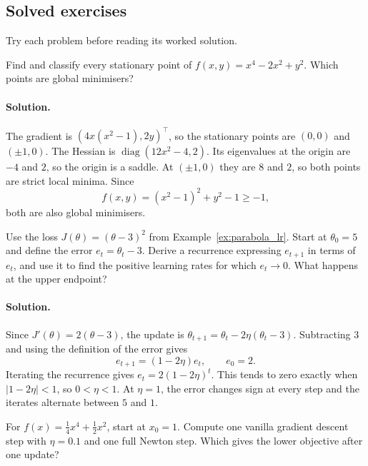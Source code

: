 \clearpage
\subsection{Solved exercises}

Try each problem before reading its worked solution.

\begin{exercise}
Find and classify every stationary point of $f(x,y)=x^4-2x^2+y^2$. Which points are global minimisers?
\end{exercise}

\paragraph{Solution.}
The gradient is $(4x(x^2-1),2y)^\top$, so the stationary points are $(0,0)$ and $(\pm1,0)$. The Hessian is $\operatorname{diag}(12x^2-4,2)$. Its eigenvalues at the origin are $-4$ and $2$, so the origin is a saddle. At $(\pm1,0)$ they are $8$ and $2$, so both points are strict local minima. Since
\[
    f(x,y)=(x^2-1)^2+y^2-1\ge -1,
\]
both are also global minimisers.

\begin{exercise}
Use the loss $J(\theta)=(\theta-3)^2$ from Example~\ref{ex:parabola_lr}. Start at $\theta_0=5$ and define the error $e_t=\theta_t-3$. Derive a recurrence expressing $e_{t+1}$ in terms of $e_t$, and use it to find the positive learning rates for which $e_t\to0$. What happens at the upper endpoint?
\end{exercise}

\paragraph{Solution.}
Since $J'(\theta)=2(\theta-3)$, the update is $\theta_{t+1}=\theta_t-2\eta(\theta_t-3)$. Subtracting $3$ and using the definition of the error gives
\[
    e_{t+1}=(1-2\eta)e_t,\qquad e_0=2.
\]
Iterating the recurrence gives $e_t=2(1-2\eta)^t$. This tends to zero exactly when $|1-2\eta|<1$, so $0<\eta<1$. At $\eta=1$, the error changes sign at every step and the iterates alternate between $5$ and $1$.

\begin{exercise}
For $f(x)=\tfrac14x^4+\tfrac12x^2$, start at $x_0=1$. Compute one vanilla gradient descent step with $\eta=0.1$ and one full Newton step. Which gives the lower objective after one update?
\end{exercise}

